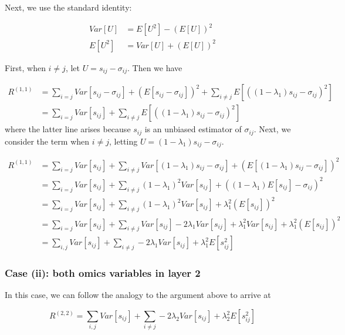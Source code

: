 \documentclass[
]{article}
\begin{document}
Next, we use the standard identity:

\[
\begin{aligned}
Var[U] &= E[U^2] - (E[U])^2 \\
E[U^2] &= Var[U] + (E[U])^2
\end{aligned}
\]

First, when \(i \neq j\), let \(U = s_{ij} - \sigma_{ij}\). Then we have

\[
\begin{aligned}
R^{(1,1)} &= \sum_{i = j}Var[s_{ij} -\sigma_{ij}] + (E[s_{ij} - \sigma_{ij}])^2
 +  \sum_{i \neq j}E\left[\left((1-\lambda_1)s_{ij} - \sigma_{ij}\right)^2\right] \\
&=  \sum_{i = j}Var[s_{ij}]  +  \sum_{i \neq j}E\left[\left((1-\lambda_1)s_{ij} - \sigma_{ij}\right)^2\right] 
\end{aligned}
\] where the latter line arises because \(s_{ij}\) is an unbiased
estimator of \(\sigma_{ij}\). Next, we consider the term when
\(i \neq j\), letting \(U = (1-\lambda_1)s_{ij} - \sigma_{ij}\).

\[
\begin{aligned}
R^{(1,1)} &=  \sum_{i = j}Var[s_{ij}]  +  \sum_{i \neq j} 
Var[(1-\lambda_1)s_{ij} - \sigma_{ij}] + (E[(1-\lambda_1)s_{ij} - \sigma_{ij}])^2 \\
&= \sum_{i=j}Var[s_{ij}] + \sum_{i \neq j}(1-\lambda_1)^2Var[s_{ij}] + ((1-\lambda_1)E[s_{ij}] - \sigma_{ij})^2 \\
&= \sum_{i=j}Var[s_{ij}] + \sum_{i \neq j}(1-\lambda_1)^2Var[s_{ij}] + \lambda_1^2(E[s_{ij}])^2  \\
&= \sum_{i=j} Var[s_{ij}] + \sum_{i \neq j}Var[s_{ij}]-2\lambda_1Var[s_{ij}] + \lambda_1^2Var[s_{ij}] + \lambda_1^2(E[s_{ij}])^2 \\
&= \sum_{i,j}Var[s_{ij}] + \sum_{i \neq j}-2\lambda_1Var[s_{ij}] + \lambda_1^2E[s_{ij}^2]
\end{aligned}
\]

\hypertarget{case-ii-both-omics-variables-in-layer-2}{%
\subsubsection{Case (ii): both omics variables in layer
2}\label{case-ii-both-omics-variables-in-layer-2}}

In this case, we can follow the analogy to the argument above to arrive
at

\[
R^{(2,2)} = \sum_{i,j}Var[s_{ij}] + \sum_{i \neq j}-2\lambda_2Var[s_{ij}] + \lambda_2^2E[s_{ij}^2]
\]
\end{document}
